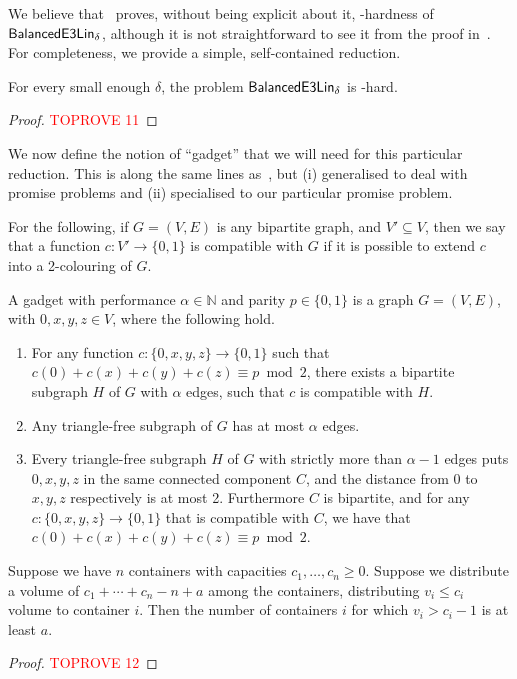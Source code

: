 \documentclass[a4paper,11pt, DIV=11]{scrartcl}
\DeclareMathOperator{\belin}{\textnormal{\textsf{BalancedE3Lin}}}
\newcommand{\N}{\ensuremath{\mathbb{N}}}
\theoremstyle{plain}
\theoremstyle{definition}
\begin{document}
We believe 
that~\cite{Hastad01} proves, without being explicit about it, \NP-hardness of $\belin_\delta$, although it is not straightforward to see it from the proof in~\cite{Hastad01}. For completeness, we provide a simple, self-contained reduction.

\begin{lemma}\label{lem:source}
    For every small enough $\delta$, the problem $\belin_\delta$ is \NP-hard.
\end{lemma}

\begin{proof}\textcolor{red}{TOPROVE 11}\end{proof}


We now define the notion of ``gadget'' that we will need for this particular reduction. This is along the same lines as~\cite{BGS:98,Trevisan00:sicomp}, but (i) generalised to deal with promise problems and (ii) specialised to our particular promise problem.

For the following, if $G = (V, E)$ is any bipartite graph, and $V' \subseteq V$, then we say that a function $c : V' \to \{ 0, 1 \}$ is compatible with $G$ if it is possible to extend $c$ into a 2-colouring of $G$.

\begin{definition}\label{def:gadget}
    A gadget with performance $\alpha \in \N$ and parity $p \in \{0, 1\}$ is a graph $G = (V, E)$, with $0, x, y, z \in V$, where the following hold.
    \begin{enumerate}
        \item\label{item:soundness} For any function $c : \{ 0, x, y, z \} \to \{0, 1\}$ such that $c(0) + c(x) + c(y) + c(z) \equiv p \bmod 2$, there exists a bipartite subgraph $H$ of $G$ with $\alpha$ edges, such that $c$ is compatible with $H$.
        \item\label{item:completenes1} Any triangle-free subgraph of $G$ has at most $\alpha$ edges.
        \item\label{item:completenes2} Every triangle-free subgraph $H$ of $G$ with strictly more than $\alpha-1$ edges puts $0, x, y, z$ in the same connected component $C$, and the distance from $0$ to $x, y, z$ respectively is at most 2. Furthermore $C$ is bipartite, and for any $c : \{0, x, y, z\} \to \{0, 1\}$ that is compatible with $C$, we have that $c(0) + c(x) + c(y) + c(z) \equiv p \bmod 2$.
    \end{enumerate}
\end{definition}

\begin{lemma}\label{lem:bins}
    Suppose we have $n$ containers with capacities $c_1, \ldots, c_n \geq 0$. Suppose we distribute a volume of $c_1 + \cdots + c_n - n + a$ among the containers, distributing $v_i \leq c_i$ volume to container $i$. Then the number of containers $i$ for which $v_i > c_i - 1$ is at least $a$.
\end{lemma}
\begin{proof}\textcolor{red}{TOPROVE 12}\end{proof}
\end{document}
